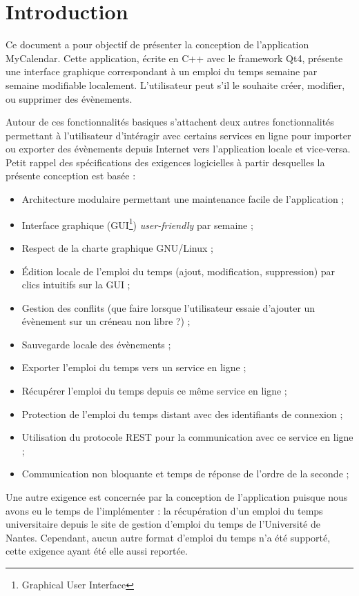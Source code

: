 \chapter*{Introduction}
	Ce document a pour objectif de présenter la conception de l'application MyCalendar. Cette application, écrite en C++ avec le framework Qt4, présente une interface graphique correspondant à un emploi du temps semaine par semaine modifiable localement. L'utilisateur peut s'il le souhaite créer, modifier, ou supprimer des évènements.

	Autour de ces fonctionnalités basiques s'attachent deux autres fonctionnalités permettant à l'utilisateur d'intéragir avec certains services en ligne pour importer ou exporter des évènements depuis Internet vers l'application locale et vice-versa.\\

	Petit rappel des spécifications des exigences logicielles à partir desquelles la présente conception est basée :
	\begin{itemize}
		\item Architecture modulaire permettant une maintenance facile de l'application ;
		\item Interface graphique (GUI\footnote{Graphical User Interface}) \emph{user-friendly} par semaine ;
		\item Respect de la charte graphique GNU/Linux ;
		\item Édition locale de l'emploi du temps (ajout, modification, suppression) par clics intuitifs sur la GUI ;
		\item Gestion des conflits (que faire lorsque l'utilisateur essaie d'ajouter un évènement sur un créneau non libre ?) ;
		\item Sauvegarde locale des évènements ;
		\item Exporter l'emploi du temps vers un service en ligne ;
		\item Récupérer l'emploi du temps depuis ce même service en ligne ;
		\item Protection de l'emploi du temps distant avec des identifiants de connexion ;
		\item Utilisation du protocole REST pour la communication avec ce service en ligne ;
		\item Communication non bloquante et temps de réponse de l'ordre de la seconde ;
	\end{itemize}
	\vspace{0.5cm}
	Une autre exigence est concernée par la conception de l'application puisque nous avons eu le temps de l'implémenter : la récupération d'un emploi du temps universitaire depuis le site de gestion d'emploi du temps de l'Université de Nantes. Cependant, aucun autre format d'emploi du temps n'a été supporté, cette exigence ayant été elle aussi reportée.
		

